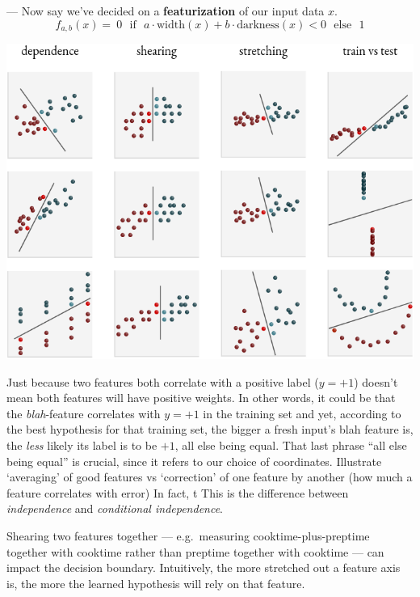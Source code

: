 \documentclass[11pt, justified]{tufte-book}
\newcommand{\attnsam}[1]{{\red \textsf{#1}}}
\newcommand{\sampassage}[1]{
   \vspace{0.1cm}
   \par\noindent{\hspace{-2cm}\normalsize \sc \gre #1} ---
}
\theoremstyle{definition}
\begin{document}
      \sampassage{geometry of feature-space} %
        Now say we've decided on a \textbf{featurization} of our input
        data $x$.
        $$
          f_{a,b}(x) = ~0 \text{~~if~~} a\cdot \text{width}(x) + b\cdot\text{darkness}(x) < 0 \text{~~else~~} 1 
        $$ 
        \begin{marginfigure}
          \includegraphics[width=\textwidth]{feature-space-phenomena}
        \end{marginfigure}

        Just because two features both correlate with a positive label ($y=+1$)
        doesn't mean both features will have positive weights.  In other words,
        it could be that the \emph{blah}-feature correlates with $y=+1$ in the
        training set and yet, according to the best hypothesis for that
        training set, the bigger a fresh input's blah feature is, the
        \emph{less} likely its label is to be $+1$, all else being equal.  That
        last phrase ``all else being equal'' is crucial, since it refers to our
        choice of coordinates.
        \attnsam{Illustrate `averaging' of good features vs `correction' of one
        feature by another (how much a feature correlates with error)}
        In fact, t This is the difference between \emph{independence} and
        \emph{conditional independence}.

        Shearing two features together --- e.g.\ measuring
        cooktime-plus-preptime together with cooktime rather than preptime
        together with cooktime --- can impact the decision boundary.
        Intuitively, the more stretched out a feature axis is, the more the
        learned hypothesis will rely on that feature.
\end{document}
